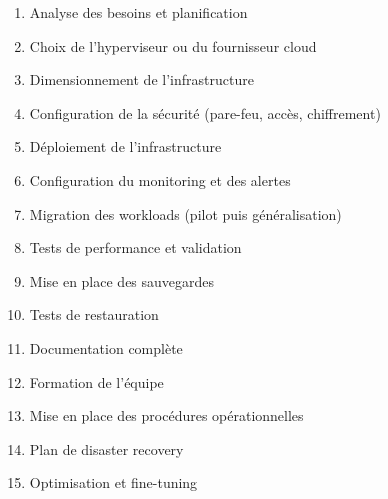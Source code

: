 \documentclass[11pt,a4paper]{article}
\begin{document}
\begin{enumerate}
    \item[$\square$] Analyse des besoins et planification
    \item[$\square$] Choix de l'hyperviseur ou du fournisseur cloud
    \item[$\square$] Dimensionnement de l'infrastructure
    \item[$\square$] Configuration de la sécurité (pare-feu, accès, chiffrement)
    \item[$\square$] Déploiement de l'infrastructure
    \item[$\square$] Configuration du monitoring et des alertes
    \item[$\square$] Migration des workloads (pilot puis généralisation)
    \item[$\square$] Tests de performance et validation
    \item[$\square$] Mise en place des sauvegardes
    \item[$\square$] Tests de restauration
    \item[$\square$] Documentation complète
    \item[$\square$] Formation de l'équipe
    \item[$\square$] Mise en place des procédures opérationnelles
    \item[$\square$] Plan de disaster recovery
    \item[$\square$] Optimisation et fine-tuning
\end{enumerate}
\end{document}
